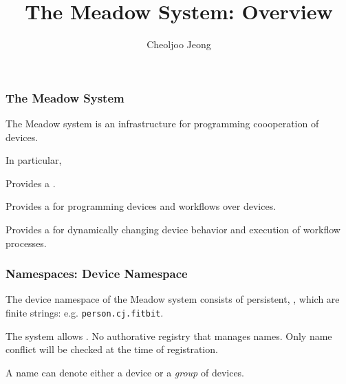 \documentclass{beamer}
\title{The Meadow System: Overview}
\author{Cheoljoo Jeong}
\date{}
\begin{document}
\begin{frame}
\titlepage
\end{frame}


\begin{frame}
\frametitle{The Meadow System}

The Meadow system is an infrastructure for 
programming coooperation of devices.

\vspace*{0.4cm}

In particular,

\vspace*{0.2cm}

\bit
\w Provides a .

\vspace*{0.2cm}

\w Provides a  for programming devices and workflows over devices.

\vspace*{0.2cm}

\w Provides a  for dynamically changing device behavior and
execution of workflow processes. 

\vspace*{0.2cm}

\eit

\end{frame}


\begin{frame}[fragile]
\frametitle{Namespaces: Device Namespace}

The device namespace of the Meadow system consists of persistent,
, which are finite strings: e.g.
\verb+person.cj.fitbit+. 

\vspace*{0.5cm}

The system allows .
   \bit
   \w No authorative registry that manages names. 
   \w Only name conflict will be checked at the time of registration.
   \eit

\vspace*{0.4cm}

A name can denote either a device or a {\em group\/} of devices.

\end{frame}
\end{document}
